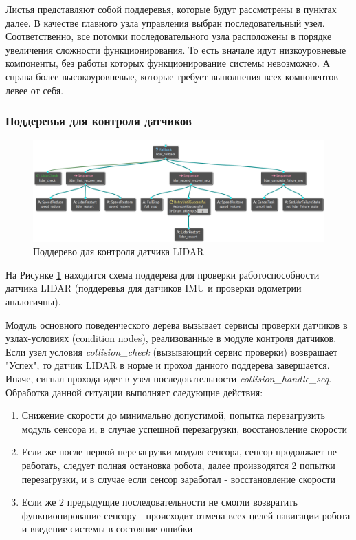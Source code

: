 Листья представляют собой поддеревья, которые будут рассмотрены в пунктах далее.
В качестве главного узла управления выбран последовательный узел. \\
Соответственно, все потомки последовательного узла расположены в порядке увеличения сложности функционирования. То есть вначале идут низкоуровневые компоненты, без работы которых функционирование системы невозможно. А справа более высокоуровневые, которые требует выполнения всех компонентов левее от себя.

\subsubsection{Поддеревья для контроля датчиков}

\begin{figure}[h]
    \centering
    \includegraphics[width=1.0\textwidth]{images/chap_3/sensor_subtree.png}
    \caption{Поддерево для контроля датчика LIDAR}
    \label{fig:sensor_subtree}
\end{figure}

На Рисунке \ref*{fig:sensor_subtree} находится схема поддерева для проверки работоспособности датчика LIDAR (поддеревья для датчиков IMU и проверки одометрии аналогичны).

Модуль основного поведенческого дерева вызывает сервисы проверки датчиков в узлах-условиях (condition nodes), реализованные в модуле контроля датчиков. Если узел условия \textit{collision\_check} (вызывающий сервис проверки) возвращает "Успех", то датчик LIDAR в норме и проход данного поддерева завершается. Иначе, сигнал прохода идет в узел последовательности \textit{collision\_handle\_seq}. \\
Обработка данной ситуации выполняет следующие действия:
\begin{enumerate}
    \item Снижение скорости до минимально допустимой, попытка перезагрузить модуль сенсора и, в случае успешной перезагрузки, восстановление скорости
    \item Если же после первой перезагрузки модуля сенсора, сенсор продолжает не работать, следует полная остановка робота, далее производятся 2 попытки перезагрузки, и в случае если сенсор заработал - восстановление скорости
    \item Если же 2 предыдущие последовательности не смогли возвратить функционирование сенсору - происходит отмена всех целей навигации робота и введение системы в состояние ошибки
\end{enumerate}

